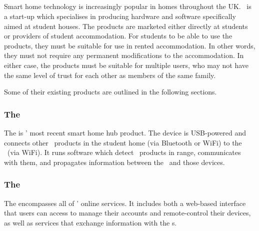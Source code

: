 
\subsection{\sshFullName}

Smart home technology is increasingly popular in homes throughout the UK. \sshFullName\ is a start-up which specialises in producing hardware and software specifically aimed at student houses. The products are marketed either directly at students or providers of student accommodation. For students to be able to use the products, they must be suitable for use in rented accommodation. In other words, they must not require any permanent modifications to the accommodation. In either case, the products must be suitable for multiple users, who may not have the same level of trust for each other as members of the same family.

Some of their existing products are outlined in the following sections.

\subsubsection{The \sshHub}

The \emph{\sshHub} is \sshShortName' most recent smart home hub product. The device is USB-powered and connects other \ssh\ products in the student home (via Bluetooth or WiFi) to the \sshCloud\ (via WiFi). It runs software which detect \ssh\ products in range, communicates with them, and propagates information between the \sshCloud\ and those devices.

\subsubsection{The \sshCloud}

The \emph{\sshCloud} encompasses all of \sshFullName' online services. It includes both a web-based interface that users can access to manage their accounts and remote-control their devices, as well as services that exchange information with the \sshHubShort s.

